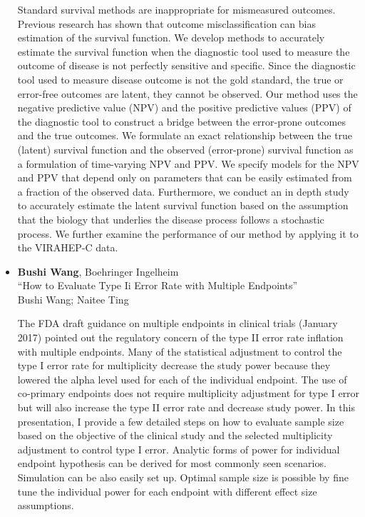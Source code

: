 \begin{itemize}
Standard survival methods are inappropriate for mismeasured outcomes. Previous research has shown that outcome misclassification can bias estimation of the survival function. We develop methods to accurately estimate the survival function when the diagnostic tool used to measure the outcome of disease is not perfectly sensitive and specific. Since the diagnostic tool used to measure disease outcome is not the gold standard, the true or error-free outcomes are latent, they cannot be observed. Our method uses the negative predictive value (NPV) and the positive predictive values (PPV) of the diagnostic tool to construct a bridge between the error-prone outcomes and the true
outcomes. We formulate an exact relationship between the true (latent) survival function and the observed (error-prone) survival function as a formulation of time-varying NPV and PPV. We specify models for the NPV and PPV that depend only on parameters that can be easily estimated from a fraction of the observed data. Furthermore, we conduct an in depth study to accurately estimate the latent survival function based on the assumption that the biology that underlies the disease process follows a stochastic process. We further examine the performance of our method by applying it to the VIRAHEP-C data.

\item \textbf{Bushi Wang}, Boehringer Ingelheim \\
``How to Evaluate Type Ii Error Rate with Multiple Endpoints'' \\
Bushi Wang; Naitee Ting


The FDA draft guidance on multiple endpoints in clinical trials (January 2017) pointed out the regulatory concern of the type II error rate inflation with multiple endpoints. Many of the statistical adjustment to control the type I error rate for multiplicity decrease the study power because they lowered the alpha level used for each of the individual endpoint. The use of co-primary endpoints does not require multiplicity adjustment for type I error but will also increase the type II error rate and decrease study power. In this presentation, I provide a few detailed steps on how to evaluate sample size based on the objective of the clinical study and the selected multiplicity adjustment to control type I error. Analytic forms of power for individual endpoint hypothesis can be derived for most commonly seen scenarios. Simulation can be also easily set up. Optimal sample size is possible by fine tune the individual power for each endpoint with different effect size assumptions.


\end{itemize}
